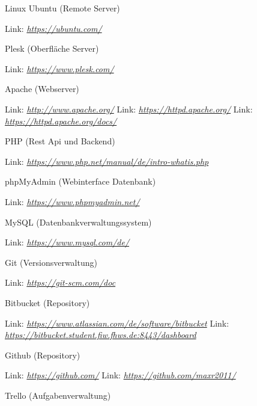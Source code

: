 \documentclass{scrartcl}
\begin{document}
\noindent Linux Ubuntu (Remote Server) 

\noindent Link: \textit{\url{https://ubuntu.com/} \newline}

\noindent Plesk (Oberfläche Server)

\noindent Link: \textit{\url{https://www.plesk.com/} \newline}

\noindent Apache (Webserver)

\noindent Link: \textit{\url{http://www.apache.org/} \newline} 
\noindent Link: \textit{\url{https://httpd.apache.org/} \newline}
\noindent Link: \textit{\url{https://httpd.apache.org/docs/} \newline}

\noindent PHP (Rest Api und Backend) 

\noindent Link: \textit{\url{https://www.php.net/manual/de/intro-whatis.php} \newline}

\newpage

\noindent phpMyAdmin (Webinterface Datenbank)

\noindent Link: \textit{\url{https://www.phpmyadmin.net/} \newline}

\noindent MySQL (Datenbankverwaltungssystem) 

\noindent Link: \textit{\url{https://www.mysql.com/de/} \newline}

\noindent Git (Versionsverwaltung)

\noindent Link: \textit{\url{https://git-scm.com/doc} \newline}

\noindent Bitbucket (Repository)

\noindent Link: \textit{\url{https://www.atlassian.com/de/software/bitbucket} \newline}
\noindent Link: \textit{\url{https://bitbucket.student.fiw.fhws.de:8443/dashboard} \newline}

\noindent Github (Repository)

\noindent Link: \textit{\url{https://github.com/} \newline}
\noindent Link: \textit{\url{https://github.com/maxr2011/} \newline}

\noindent Trello (Aufgabenverwaltung) 
\end{document}

